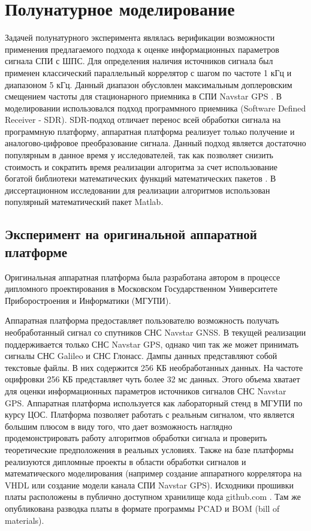 \chapter{Полунатурное моделирование}
\label{ss:hw}

Задачей полунатурного эксперимента являлась верификации возможности применения предлагаемого подхода к оценке информационных параметров сигнала СПИ с ШПС. Для определения наличия источников
сигнала был применен классический параллельный коррелятор \cite{tsui} с шагом по частоте 1 кГц и диапазоном 5 кГц. Данный диапазон обусловлен максимальным доплеровским
смещением частоты для стационарного приемника в СПИ Navstar GPS \cite{shahtarin_sync, tsui}. В моделировании использовался подход программного приемника
(Software Defined Receiver - SDR). SDR-подход отличает перенос всей обработки сигнала на программную платформу, аппаратная платформа реализует только
получение и аналогово-цифровое  преобразование сигнала. Данный подход является достаточно популярным в данное время у исследователей, так как позволяет снизить стоимость и
сократить время реализации алгоритма за счет использование богатой библиотеки математических функций математических пакетов \cite{grayver-book}.
В диссертационном исследовании для реализации алгоритмов использован популярный математический пакет Matlab.

\section{Эксперимент на оригинальной аппаратной платформе}
Оригинальная аппаратная платформа была разработана автором в процессе дипломного проектирования в Московском Государственном Университете Приборостроения и Информатики (МГУПИ).

Аппаратная платформа предоставляет пользователю возможность получать необработанный сигнал со спутников СНС Navstar GNSS. В текущей реализации поддерживается только 
СНС Navstar GPS, однако чип так же может принимать сигналы СНС Galileo и СНС Глонасс. Дампы данных представляют собой текстовые файлы. В них содержится 256 КБ необработанных данных.
На частоте оцифровки 256 КБ представляет чуть более 32 мс данных. Этого объема хватает для оценки информационных параметров источников сигналов СНС Navstar GPS.
Аппаратная платформа используется как лабораторный стенд в МГУПИ по курсу ЦОС. Платформа позволяет работать с реальным сигналом, что является большим плюсом в
виду того, что дает возможность наглядно продемонстрировать работу алгоритмов обработки сигнала и проверить теоретические предположения в реальных условиях.
Также на базе платформы реализуются дипломные проекты в области обработки сигналов и математического моделирования
(например создание аппаратного коррелятора на VHDL или создание модели канала СПИ Navstar GPS).
Исходники прошивки платы расположены в публично доступном хранилище кода github.com \cite{github-gpsproject}.
Там же опубликована разводка платы в формате программы PCAD и BOM (bill of materials).

